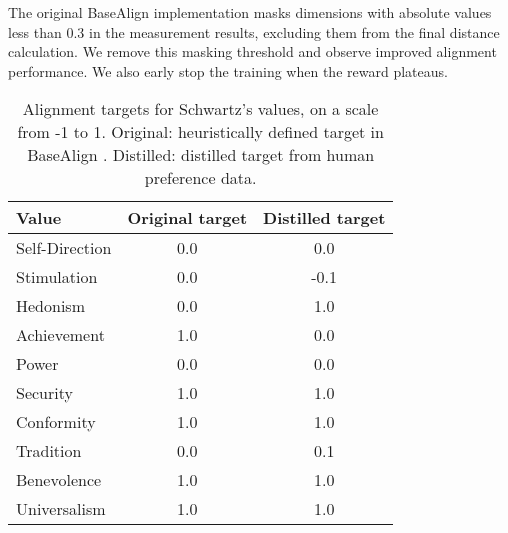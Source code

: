 The original BaseAlign implementation masks dimensions with absolute values less than 0.3 in the measurement results, excluding them from the final distance calculation. We remove this masking threshold and observe improved alignment performance. We also early stop the training when the reward plateaus.

\begin{table}[h]
    \centering
    \begin{tabular}{l|c|c}
    \toprule
    Value & Original target & Distilled target \\
    \midrule
    Self-Direction & 0.0 & 0.0 \\
    Stimulation & 0.0 & -0.1\\
    Hedonism & 0.0 & 1.0 \\
    Achievement & 1.0 & 0.0 \\
    Power & 0.0 & 0.0 \\
    Security & 1.0 & 1.0 \\
    Conformity & 1.0 & 1.0 \\
    Tradition & 0.0 & 0.1\\
    Benevolence & 1.0 & 1.0 \\
    Universalism & 1.0 & 1.0 \\
    \bottomrule
    \end{tabular}
    \caption{Alignment targets for Schwartz's values, on a scale from -1 to 1. Original: heuristically defined target in BaseAlign \cite{yao2023value_fulcra}. Distilled: distilled target from human preference data.}
    \label{tab:alignment_targets_schwartz}
\end{table}








